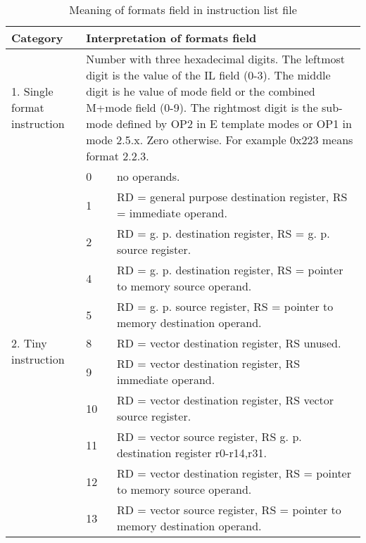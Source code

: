\documentclass[forwardcom.tex]{subfiles}
\begin{document}
\pagebreak %
\label{table_format_field_in_list}
\begin{longtable} {|p{18mm}|p{20mm} p{80mm}|}
\caption{Meaning of formats field in instruction list file} 
\label{table:MeaningOfFormatsFieldInInstructionListFile}
\\
\endfirsthead
\endhead
\hline
\bfseries Category & \multicolumn{2}{|l|}{\bfseries Interpretation of formats field} \\
\hline
1.  Single format instruction & \multicolumn{2}{|p{102mm}|}{
Number with three hexadecimal digits. \newline
The leftmost digit is the value of the IL field (0-3). \newline
The middle digit is he value of mode field or the combined M+mode field (0-9).\newline
The rightmost digit is the sub-mode defined by OP2 in E template modes or OP1 in mode 2.5.x. Zero otherwise. \newline
For example 0x223 means format 2.2.3.
}  \\
\hline
\multirow{11}{*}{\parbox{18mm}{2. Tiny instruction}} 
  &  0 & no operands. \\
  &  1 & RD = general purpose destination register, RS = immediate operand. \\
  &  2 & RD = g. p. destination register, RS = g. p. source register. \\
  &  4 & RD = g. p. destination register, RS = pointer to memory source operand. \\
  &  5 & RD = g. p. source register, RS = pointer to memory destination operand. \\
  &  8 & RD = vector destination register, RS unused. \\
  &  9 & RD = vector destination register, RS immediate operand. \\
  & 10 & RD = vector destination register, RS vector source register. \\
  & 11 & RD = vector source register, RS g. p. destination register r0-r14,r31. \\
  & 12 & RD = vector destination register, RS = pointer to memory source operand. \\
  & 13 & RD = vector source register, RS = pointer to memory destination operand. \\
\hline

\end{longtable}
\end{document}

